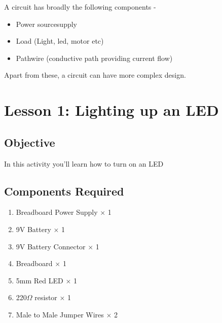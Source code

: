 A circuit has broadly the following components -
\begin{itemize}
    \item Power source\/supply
    \item Load (Light, led, motor etc)
    \item Path\/wire (conductive path providing current flow)
\end{itemize}
Apart from these, a circuit can have more complex design.


\clearpage

\section{Lesson 1: Lighting up an LED}
\subsection{Objective}
In this activity you'll learn how to turn on an LED
\subsection{Components Required}
\begin{enumerate}
    \item Breadboard Power Supply $\times$ 1
    \item 9V Battery $\times$ 1 
    \item 9V Battery Connector $\times$ 1
    \item Breadboard $\times$ 1
    \item 5mm Red LED $\times$ 1
    \item 220$\Omega$ resistor $\times$ 1
    \item Male to Male Jumper Wires $\times$ 2
\end{enumerate}
